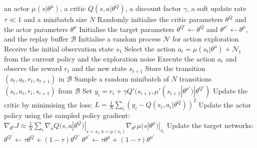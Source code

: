 \begin{algorithm}[htb!]
\caption{Deep Deterministic Policy Gradient \cite{lillicrap_continuous_2015}.}
\label{Codes:DeepDeterministicPolicyGradient}
\begin{algorithmic}
\REQUIRE an actor $\mu(s | \theta^{\mu})$, a critic $Q(s, a | \theta^{Q})$, a discount factor $\gamma$, a soft update rate $\tau \ll 1$ and a minibatch size $N$
\STATE Randomly initialise the critic parameters $\theta^{Q}$ and the actor parameters $\theta^{\mu}$
\STATE Initialise the target parameters $\theta^{Q'} \leftarrow \theta^{Q}$ and $\theta^{\mu'} \leftarrow \theta^{\mu}$, and the replay buffer $\mathcal{B}$
    \STATE Initialise a random process $\mathcal{N}$ for action exploration
    \STATE Receive the initial observation state $s_1$
        \STATE Select the action $a_t = \mu(s_t | \theta^{\mu}) + \mathcal{N}_t$ from the current policy and the exploration noise
        \STATE Execute the action $a_t$ and observe the reward $r_t$ and the new state $s_{t+1}$
        \STATE Store the transition $(s_t, a_t, r_t, s_{t+1})$ in $\mathcal{B}$
        \STATE Sample a random minibatch of $N$ transitions $(s_i, a_i, r_i, s_{i+1})$ from $\mathcal{B}$
        \STATE Set $y_i = r_i + \gamma Q'(s_{i+1}, \mu'(s_{i+1} | \theta^{\mu'}) | \theta^{Q'})$
        \STATE Update the critic by minimising the loss: $L = \frac{1}{N}\sum_i (y_i - Q(s_i, a_i | \theta^{Q}))^2$
        \STATE Update the actor policy using the sampled policy gradient:
        \STATE $\nabla_{\theta^{\mu}} J \approx \frac{1}{N}\sum_i \nabla_a Q(s, a | \theta^{Q})|_{s = s_i, a = \mu(s_i)} \nabla_{\theta^{\mu}} \mu(s | \theta^{\mu})|_{s_i}$
        \STATE Update the target networks:
        \STATE $\theta^{Q'} \leftarrow \tau \theta^{Q} + (1 - \tau) \theta^{Q'}$
        \STATE $\theta^{\mu'} \leftarrow \tau \theta^{\mu} + (1 - \tau) \theta^{\mu'}$
    \ENDFOR
\ENDFOR
\end{algorithmic}
\end{algorithm}